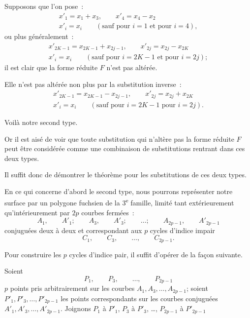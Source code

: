 \documentclass{article}
\begin{document}
Supposons que l'on pose~:
\[ \begin{gathered} x'_{1} = x_{1} + x_{3}, \qquad x'_{4} = x_{4} - x_{2} \\ x'_{i} = x_{i} \qquad (\text{sauf pour } i = 1 \text{ et pour } i = 4), \end{gathered} \]
ou plus généralement~:
\[ \begin{gathered} x'_{2K-1} = x_{2K-1} + x_{2j-1}, \qquad x'_{2j} = x_{2j} - x_{2K} \\ x'_{i} = x_{i} \qquad (\text{sauf pour } i = 2K - 1 \text{ et pour } i = 2j); \end{gathered} \]
il est clair que la forme réduite $F$ n'est pas altérée.

Elle n'est pas altérée non plus par la substitution inverse~:
\[ \begin{gathered} x'_{2K-1} = x_{2K-1} - x_{2j-1}, \qquad x'_{2j} = x_{2j} + x_{2K} \\ x'_{i} = x_{i} \qquad (\text{sauf pour } i = 2K - 1 \text{ pour } i = 2j). \end{gathered} \]

Voilà notre second type.

Or il est aisé de voir que toute substitution qui n'altère pas la forme réduite $F$ peut être considérée comme une combinaison de substitutions rentrant dans ces deux types.

Il suffit donc de démontrer le théorème pour les substitutions de ces deux types.

En ce qui concerne d'abord le second type, nous pourrons représenter notre surface par un polygone fuchsien de la 3\textsuperscript{e} famille, limité tant extérieurement qu'intérieurement par $2p$ courbes fermées~:
\[ A_{1}, \qquad A'_{1}; \qquad A_{3}, \qquad A'_{3}; \qquad \ldots; \qquad A_{2p-1}, \qquad A'_{2p-1} \]
conjuguées deux à deux et correspondant aux $p$ cycles d'indice impair
\[ C_{1}, \qquad C_{3}, \qquad \ldots, \qquad C_{2p-1}. \]

Pour construire les $p$ cycles d'indice pair, il suffit d'opérer de la façon suivante.

Soient
\[ P_{1}, \qquad P_{3}, \qquad \ldots, \qquad P_{2p-1} \]
$p$ points pris arbitrairement sur les courbes $A_{1}, A_{3}, \ldots, A_{2p-1}$; soient $P'_{1}, P'_{3}, \ldots, P'_{2p-1}$ les points correspondants sur les courbes conjuguées $A'_{1}, A'_{3}, \ldots, A'_{2p-1}$. Joignons $P_{1}$ à $P'_{1}$, $P_{3}$ à $P'_{3}$, \ldots, $P_{2p-1}$ à $P'_{2p-1}$
\end{document}
